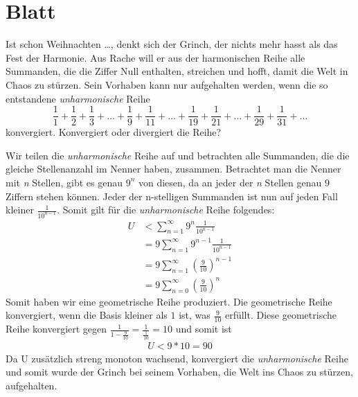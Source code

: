 \section{Blatt}

\begin{aufg}[6 Punkte]
\glqq Ist schon Weihnachten \ldots\grqq, denkt sich der Grinch, der nichts mehr hasst als das Fest der Harmonie. Aus Rache will er aus der harmonischen Reihe alle Summanden, die die Ziffer Null enthalten, streichen und hofft, damit die Welt in Chaos zu st\"urzen. Sein Vorhaben kann nur aufgehalten werden, wenn die so entstandene \emph{unharmonische} Reihe
\[
 \frac{1}{1} + \frac{1}{2} + \frac{1}{3} + \ldots + \frac{1}{9} + \frac{1}{11} + \ldots + \frac{1}{19} + \frac{1}{21} + \ldots + \frac{1}{29} + \frac{1}{31} + \ldots
\]
konvergiert. Konvergiert oder divergiert die Reihe?
\end{aufg}

\bigskip

\begin{lsg}
Wir teilen die \emph{unharmonische} Reihe auf und betrachten alle Summanden, die die gleiche Stellenanzahl im Nenner haben, zusammen.
	Betrachtet man die Nenner mit \emph{n} Stellen, gibt es genau $9^{n}$ von diesen, da an jeder der \emph{n} Stellen genau $9$ Ziffern stehen können.
	Jeder der n-stelligen Summanden ist nun auf jeden Fall kleiner $\frac{1}{10^{n-1}}$. Somit gilt für die \emph{unharmonische} Reihe folgendes:
	\begin{align*}
		U&<\sum\limits_{n=1}^\infty 9^{n}\frac{1}{10^{n-1}}\\
		&=9\sum\limits_{n=1}^\infty 9^{n-1}\frac{1}{10^{n-1}}\\
		&=9\sum\limits_{n=1}^\infty (\frac{9}{10})^{n-1}\\
		&=9\sum\limits_{n=0}^\infty (\frac{9}{10})^{n}
	 \end{align*}
	Somit haben wir eine geometrische Reihe produziert. Die geometrische Reihe konvergiert, wenn die Basis kleiner als $1$ ist, was $\frac{9}{10}$ erfüllt.
	Diese geometrische Reihe konvergiert gegen $\frac{1}{1-\frac{9}{10}}=\frac{1}{\frac{1}{10}}=10$ und somit ist
	\begin{align*}
		U<9*10=90
	\end{align*}
	Da U zusätzlich streng monoton wachsend, konvergiert die \emph{unharmonische} Reihe und somit wurde der Grinch bei seinem Vorhaben, die Welt ins Chaos zu st\"urzen, aufgehalten. 
\end{lsg}


